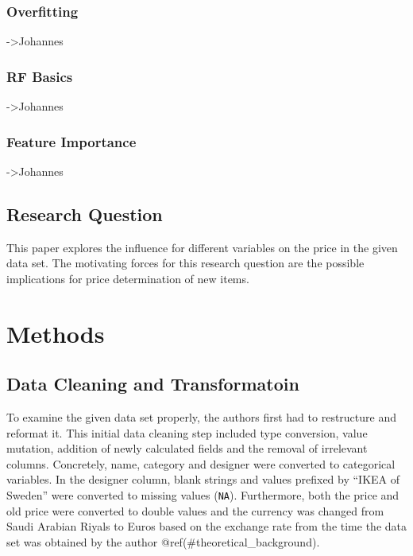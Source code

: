 \documentclass[a4paper, nobind]{templates/ociamthesis}
\begin{document}
\hypertarget{overfitting}{%
\subsection{Overfitting}\label{overfitting}}

-\textgreater{}Johannes

\hypertarget{rf-basics}{%
\subsection{RF Basics}\label{rf-basics}}

-\textgreater{}Johannes

\hypertarget{feature-importance}{%
\subsection{Feature Importance}\label{feature-importance}}

-\textgreater{}Johannes

\hypertarget{research_question}{%
\section{Research Question}\label{research_question}}

This paper explores the influence for different variables on the price in the given data set. The motivating forces for this research question are the possible implications for price determination of new items.

\hypertarget{methods}{%
\chapter{Methods}\label{methods}}

\hypertarget{datacleaning}{%
\section{Data Cleaning and Transformatoin}\label{datacleaning}}

To examine the given data set properly, the authors first had to restructure and reformat it. This initial data cleaning step included type conversion, value mutation, addition of newly calculated fields and the removal of irrelevant columns.
Concretely, name, category and designer were converted to categorical variables. In the designer column, blank strings and values prefixed by ``IKEA of Sweden'' were converted to missing values (\texttt{NA}). Furthermore, both the price and old price were converted to double values and the currency was changed from Saudi Arabian Riyals to Euros based on the exchange rate from the time the data set was obtained by the author @ref(\#theoretical\_background).
\end{document}
